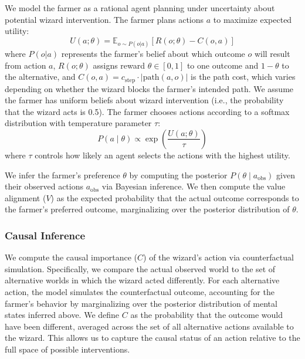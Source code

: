 \documentclass[10pt,letterpaper]{article}
\begin{document}
We model the farmer as a rational agent planning under uncertainty about potential wizard intervention. The farmer plans actions $a$ to maximize expected utility:
\begin{equation}
\label{eq:utility}
    U(a; \theta) = \mathbb{E}_{o \sim P(o|a)} \left[R(o; \theta) - C(o, a)\right]
\end{equation}
where $P(o|a)$ represents the farmer's belief about which outcome $o$ will result from action $a$, $R(o; \theta)$ assigns reward $\theta \in [0,1]$ to one outcome and $1-\theta$ to the alternative, and $C(o, a) = c_{\text{step}} \cdot |\text{path}(a, o)|$ is the path cost, which varies depending on whether the wizard blocks the farmer's intended path. 
We assume the farmer has uniform beliefs about wizard intervention (i.e., the probability that the wizard acts is 0.5).
The farmer chooses actions according to a softmax distribution with temperature parameter $\tau$:
\begin{equation}
\label{eq:softmax}
    P(a \mid \theta) \propto \exp\left(\frac{U(a; \theta)}{\tau}\right)
\end{equation}
where $\tau$ controls how likely an agent selects the actions with the highest utility. 

We infer the farmer's preference $\theta$ by computing the posterior 
$P(\theta \mid a_{\text{obs}})$ given their observed actions 
$a_{\text{obs}}$ via Bayesian inference.
We then compute the value alignment ($V$) as the expected probability that the actual outcome corresponds to the farmer's preferred outcome, marginalizing over the posterior distribution of $\theta$.

\subsubsection{Causal Inference}

We compute the causal importance ($C$) of the wizard's action via counterfactual simulation.
Specifically, we compare the actual observed world to the set of alternative worlds in which the wizard acted differently.
For each alternative action, the model simulates the counterfactual outcome, accounting for the farmer's behavior by marginalizing over the posterior distribution of mental states inferred above. 
We define $C$ as the probability that the outcome would have been different, averaged across the set of all alternative actions available to the wizard.
This allows us to capture the causal status of an action relative to the full space of possible interventions.
\end{document}
